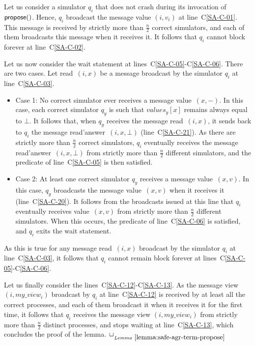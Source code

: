 \documentclass[11pt,letterpaper]{article}
\newlength {\afterproof}
\newcommand{\toto}{xxx}
\newenvironment{proofL}{\noindent{\bf Proof }}
{\hspace*{\fill}$\Box_{\mathit{Lemma}~\ref{\toto}}$\par\vspace{\afterproof}}
\begin{document}
\begin{proofL}
Let us consider a simulator $q_i$ that does not crash during its invocation of
  ${\sf propose}()$.
Hence, $q_i$ broadcast the message {\sc value} $(i,v_i)$
at line~C\ref{SA-C-01}.
This message is received by strictly more than $\frac{n}{2}$ correct 
simulators, and each
of them  broadcasts this message when it receives it. It follows that
$q_i$ cannot block forever at line~C\ref{SA-C-02}.

Let us now consider the wait statement at lines~C\ref{SA-C-05}-C\ref{SA-C-06}.
There are two cases. Let  {\sc read}~$(i,x)$ be a message
broadcast by  the simulator $q_i$ at line~C\ref{SA-C-03}.
\begin{itemize}
\vspace{-0.2cm}
\item Case 1:
No correct simulator ever receives a message {\sc value}~$(x,-)$.
In this case, each correct simulator  $q_y$ is such that
$values_y[x]$ remains always equal to $\bot$.
It follows  that, when $q_y$  receives the  message {\sc  read}~$(i,x)$,
it sends back to $q_i$ the message {\sc read'answer}~$(i,x,\bot)$
(line~C\ref{SA-C-21}).
As there are strictly more than $\frac{n}{2}$ correct simulators, 
$q_i$ eventually receives the   message  {\sc read'answer}~$(i,x,\bot)$ 
from strictly  more than $\frac{n}{2}$
different  simulators, and the predicate of line~C\ref{SA-C-05}
is then satisfied.
\vspace{-0.2cm}
\item Case 2:
At least one correct simulator $q_y$ receives a message {\sc value}~$(x,v)$.
In  this case,  $q_y$  broadcasts  the message  {\sc  value}~$(x,v)$ when  it
receives it (line~C\ref{SA-C-20}).
It follows from the broadcasts issued at this line  that $q_i$ eventually
receives {\sc value}~$(x,v)$ from strictly more than $\frac{n}{2}$ different 
simulators.
When this occurs, the predicate of line~C\ref{SA-C-06} is satisfied,
and $q_i$ exits the wait statement.
\end{itemize}
As this is true for any message  {\sc read}~$(i,x)$ broadcast by
the simulator $q_i$ at line~C\ref{SA-C-03}, it follows that $q_i$ cannot
remain block forever at lines~C\ref{SA-C-05}-C\ref{SA-C-06}.



Let us finally consider  the lines~C\ref{SA-C-12}-C\ref{SA-C-13}.
As the message  {\sc view} $(i,my\_view_i)$  broadcast by $q_i$
at line~C\ref{SA-C-12} is received by at least all the correct processes,
and  each of them broadcast it when it receives it for the first time,
it follows that $q_i$ receives the message  {\sc view} $(i,my\_view_i)$ from
strictly more than $\frac{n}{2}$ distinct processes, and stops waiting at 
line~C\ref{SA-C-13},
which concludes the proof of the lemma.
\renewcommand{\toto}{lemma:safe-agr-term-propose}
\end{proofL}
\end{document}
